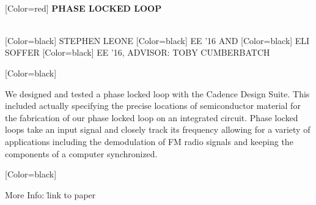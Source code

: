 \documentclass{article}
\begin{document}
\vspace{0.8in}\\
\begin{minipage}[c]{28in}
{ 
[Color=red]
\fontsize{2.7in}{0.8in}\selectfont 
\bfseries
PHASE LOCKED LOOP
}
\end{minipage}
\vspace{1in}\\
{
[Color=black]
\fontsize{1in}{1em}\selectfont 
STEPHEN LEONE
}
{
[Color=black]
\fontsize{0.8in}{1em}\selectfont 
EE '16 AND
}
{
[Color=black]
\fontsize{1in}{1em}\selectfont 
ELI SOFFER 
}
{
[Color=black]
\fontsize{0.8in}{1em}\selectfont 
EE '16, ADVISOR: TOBY CUMBERBATCH
}
\vspace{0.8in}\\
\begin{minipage}{16.8in}
{
	[Color=black]
	\fontsize{0.6in}{8em}\selectfont

	We designed and tested a phase locked loop with the Cadence Design Suite. This included
	actually specifying the precise locations of semiconductor material for the fabrication
	of our phase locked loop on an integrated circuit. Phase locked loops take an input signal
	and closely track its frequency allowing for a variety of applications including the 
	demodulation of FM radio signals and keeping the components of a computer synchronized.


} \end{minipage} 
\hspace{2in}
\begin{minipage}{11in}
{
	[Color=black]
	\fontsize{0.6in}{8em}\selectfont
	\begin{tabbing}
	More Info: \= {\ttfamily link to paper}
	\end{tabbing}
} 
\end{minipage} 
\end{document}
